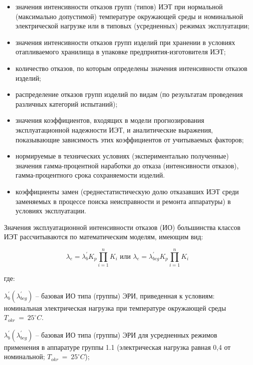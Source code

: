 \documentclass[a4paper,14pt]{article}
\begin{document}
\begin{itemize}
	\item значения интенсивности отказов групп (типов) ИЭТ при нормальной (максимально допустимой) температуре окружающей среды и номинальной электрической нагрузке или в типовых (усредненных) режимах эксплуатации;
	
	\item значения интенсивности отказов групп изделий при хранении в условиях отапливаемого хранилища в упаковке предприятия-изготовителя ИЭТ;
	
	\item количество отказов, по которым определены значения интенсивности отказов изделий;
	
	\item распределение отказов групп изделий по видам (по результатам проведения различных категорий испытаний);
	
	\item значения коэффициентов, входящих в модели прогнозирования эксплуатационной надежности ИЭТ, и аналитические выражения, показывающие зависимость этих коэффициентов от учитываемых факторов;
	
	\item нормируемые в технических условиях (экспериментально полученные) значения гамма-процентной наработки до отказа (интенсивности отказов), гамма-процентного срока сохраняемости изделий.
		
	\item коэффициенты замен (среднестатистическую долю отказавших ИЭТ среди заменяемых в процессе поиска неисправности и ремонта аппаратуры) в условиях эксплуатации.
\end{itemize}

Значения эксплуатационной интенсивности отказов (ИО) большинства классов ИЭТ рассчитываются по математическим моделям, имеющим вид:

\begin{equation}
	\lambda_{e} = \lambda_{b}^{'} K_p \prod_{i=1}^{n} K_i \text{~или~} \lambda_{e} = \lambda_{bcg}^{'} K_p \prod_{i=1}^{n} K_i
\end{equation}

где:

$\lambda_b^{'}(\lambda_{bcg}^{'})$ -- базовая ИО типа (группы) ЭРИ, приведенная к условиям: номинальная электрическая нагрузка при температуре окружающей среды $T_{okr}~=~25^{\circ}C$.

$\lambda_b^{'}(\lambda_{bcg}^{'})$ -- базовая ИО типа (группы) ЭРИ для усредненных режимов применения в аппаратуре группы 1.1 (электрическая нагрузка равная 0,4 от номинальной; $T_{okr}~=~25^{\circ}C$); 
\end{document}
